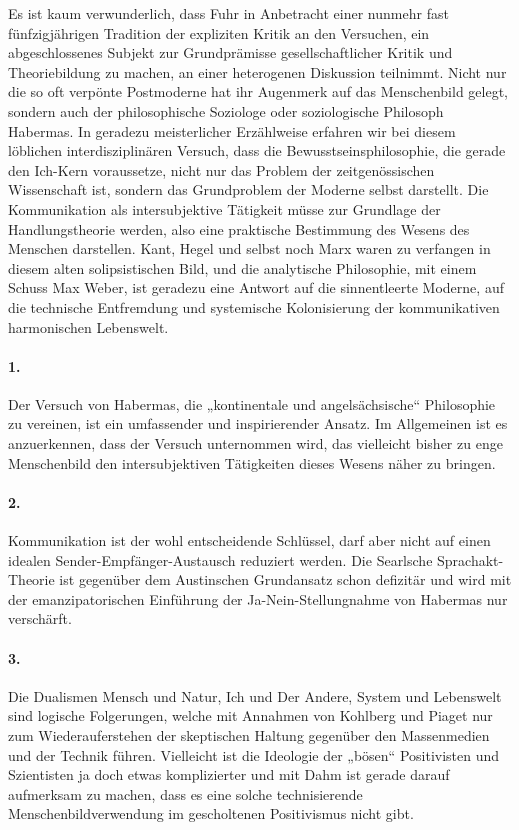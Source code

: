 \documentclass[a4paper,11pt]{article}
\begin{document}
Es ist kaum verwunderlich, dass Fuhr in Anbetracht einer nunmehr fast
fünfzigjährigen Tradition der expliziten Kritik an den Versuchen, ein
abgeschlossenes Subjekt zur Grundprämisse gesellschaftlicher Kritik und
Theoriebildung zu machen, an einer heterogenen Diskussion teilnimmt. Nicht nur
die so oft verpönte Postmoderne hat ihr Augenmerk auf das Menschenbild gelegt,
sondern auch der philosophische Soziologe oder soziologische Philosoph
Habermas. In geradezu meisterlicher Erzählweise erfahren wir bei diesem
löblichen interdisziplinären Versuch, dass die Bewusstseinsphilosophie, die
gerade den Ich-Kern voraussetze, nicht nur das Problem der zeitgenössischen
Wissenschaft ist, sondern das Grundproblem der Moderne selbst darstellt. Die
Kommunikation als intersubjektive Tätigkeit müsse zur Grundlage der
Handlungstheorie werden, also eine praktische Bestimmung des Wesens des
Menschen darstellen. Kant, Hegel und selbst noch Marx waren zu verfangen in
diesem alten solipsistischen Bild, und die analytische Philosophie, mit einem
Schuss Max Weber, ist geradezu eine Antwort auf die sinnentleerte Moderne, auf
die technische Entfremdung und systemische Kolonisierung der kommunikativen
harmonischen Lebenswelt.

\paragraph{1.} 
Der Versuch von Habermas, die „kontinentale und angelsächsische“ Philosophie zu
vereinen, ist ein umfassender und inspirierender Ansatz. Im Allgemeinen ist es
anzuerkennen, dass der Versuch unternommen wird, das vielleicht bisher zu enge
Menschenbild den intersubjektiven Tätigkeiten dieses Wesens näher zu bringen.

\paragraph{2.}
Kommunikation ist der wohl entscheidende Schlüssel, darf aber nicht auf einen
idealen Sender-Empfänger-Austausch reduziert werden. Die Searlsche
Sprachakt-Theorie ist gegenüber dem Austinschen Grundansatz schon defizitär und
wird mit der emanzipatorischen Einführung der Ja-Nein-Stellungnahme von
Habermas nur verschärft.

\paragraph{3.} 
Die Dualismen Mensch und Natur, Ich und Der Andere, System und Lebenswelt sind
logische Folgerungen, welche mit Annahmen von Kohlberg und Piaget nur zum
Wiederauferstehen der skeptischen Haltung gegenüber den Massenmedien und der
Technik führen. Vielleicht ist die Ideologie der „bösen“ Positivisten und
Szientisten ja doch etwas komplizierter und mit Dahm ist gerade darauf
aufmerksam zu machen, dass es eine solche technisierende Menschenbildverwendung
im gescholtenen Positivismus nicht gibt.
\end{document}
